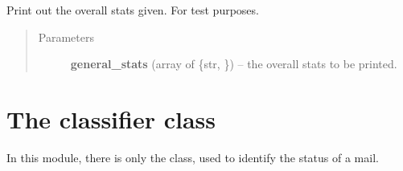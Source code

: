 \documentclass[letterpaper,10pt,english]{sphinxmanual}
\begin{document}
\begin{fulllineitems}
\begin{fulllineitems}
\end{fulllineitems}


\begin{fulllineitems}
\label{index:trainer.Trainer.trainer_print}
Print out the overall stats given. For test purposes.
\begin{quote}\begin{description}
\item[{Parameters}] \leavevmode
\textbf{general\_stats} (array of \{str, {\hyperref[index:gen_stat.Stat]{}}\}) -- the overall stats to be printed.

\end{description}\end{quote}

\end{fulllineitems}


\end{fulllineitems}



\section{The classifier class}
\label{index:the-classifier-class}
In this module, there is only the {\hyperref[index:classifier.Classifier]{}} class, used to
identify the status of a mail.
\label{index:module-classifier}
\end{document}
